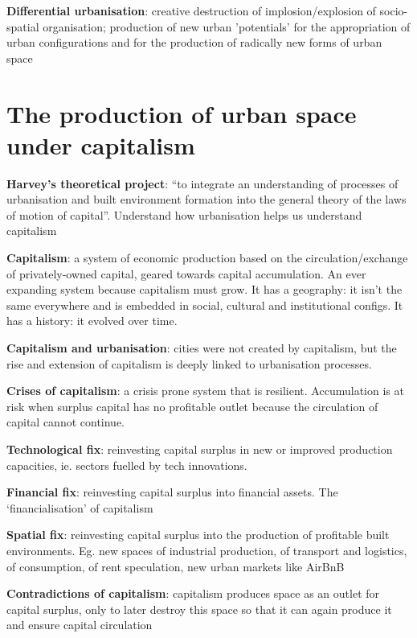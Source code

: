 \documentclass{article}
\newcommand{\alignedmarginpar}[1]{%
        \marginpar{\raggedright\small #1}
    }
\begin{document}
\textbf{Differential urbanisation}: creative destruction of implosion/explosion of socio-spatial organisation; production of new urban 'potentials' for the appropriation of urban configurations and for the production of radically new forms of urban space

\pagebreak
\section{The production of urban space under capitalism}

\textbf{Harvey's theoretical project}: ``to integrate an understanding of processes of urbanisation and built environment formation into the general theory of the laws of motion of capital''. Understand how urbanisation helps us understand capitalism

\textbf{Capitalism}: a system of economic production based on the circulation/exchange of privately-owned capital, geared towards capital accumulation. An ever expanding system because capitalism must grow. It has a geography: it isn't the same everywhere and is embedded in social, cultural and institutional configs. It has a history: it evolved over time.

\textbf{Capitalism and urbanisation}: cities were not created by capitalism, but the rise and extension of capitalism is deeply linked to urbanisation processes.

\textbf{Crises of capitalism}: a crisis prone system that is resilient. Accumulation is at risk when surplus capital has no profitable outlet because the circulation of capital cannot continue.\alignedmarginpar{China's Evergrande}

\textbf{Technological fix}: reinvesting capital surplus in new or improved production capacities, ie. sectors fuelled by tech innovations.

\textbf{Financial fix}: reinvesting capital surplus into financial assets. The `financialisation' of capitalism

\textbf{Spatial fix}: reinvesting capital surplus into the production of profitable built environments. Eg. new spaces of industrial production, of transport and logistics, of consumption, of rent speculation, new urban markets like AirBnB

\textbf{Contradictions of capitalism}: capitalism produces space as an outlet for capital surplus, only to later destroy this space so that it can again produce it and ensure capital circulation\alignedmarginpar{Harvey}
\end{document}
